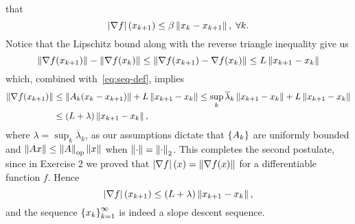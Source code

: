 \documentclass[10pt]{article}
\begin{document}
\begin{Exercise}
	that
	\[
		\left| \nabla f \right|(x_{k+1}) \leq \beta \left \| x_k - x_{k+1} \right \|, \; \forall k.
	\]
	Notice that the Lipschitz bound along with the reverse triangle inequality
	give us
	\[
		\left \| \nabla f(x_{k+1}) \right \| - \left \| \nabla f(x_k) \right \| \leq
		\left \| \nabla f(x_{k+1}) - \nabla f(x_k) \right \| \leq L \left \| x_{k+1} - x_k \right \|
	\]
	which, combined with~\eqref{eq:seq-def}, implies
	\begin{align*}
		\left \| \nabla f(x_{k+1}) \right \| &\leq \left \| A_k (x_k - x_{k+1}) \right \| + L
		\left \| x_{k+1} - x_k \right \| \leq \sup_k \overline{\lambda}_k \left \| x_{k+1} -
		x_k \right \| + L \left \| x_{k+1} - x_k \right \| \\
		&\leq \left(L + \lambda\right) \left \| x_{k+1} - x_k \right \|,
	\end{align*}
	where $\lambda = \sup_k \overline{\lambda}_k$, as our assumptions dictate
	that $\left\{ A_k \right\}$ are uniformly bounded and $\left \| Ax \right \| \leq \left \|  A  \right \|_{\mathrm{op}}
	\left \| x \right \|$ when $\left \| \cdot \right \| = \left \| \cdot \right \|_2$. This completes the second
	postulate, since in Exercise 2 we proved that $\left| \nabla f \right|(x) =
	\left \| \nabla f(x) \right \|$ for a differentiable function $f$. Hence
	\[
		\left| \nabla f \right|(x_{k+1}) \leq \left(L + \lambda\right) \left \| x_{k+1} -
		x_k \right \|,
	\]
	and the sequence $\left\{ x_k \right\}_{k=1}^{\infty}$ is indeed a slope descent
	sequence.
\end{Exercise}



\end{document}
